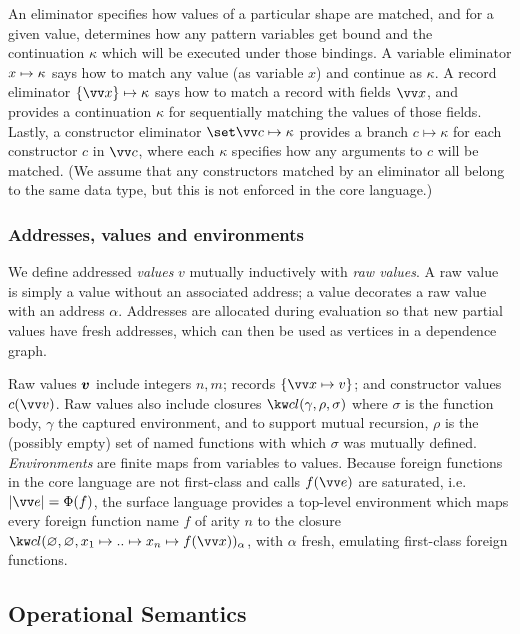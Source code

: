 An eliminator specifies how values of a particular shape are matched, and for a given value, determines how
any pattern variables get bound and the continuation $\kappa$ which will be executed under those bindings. A
variable eliminator ${x}\mapsto{\kappa}$ says how to match any value (as variable $x$) and continue as
$\kappa$. A record eliminator $\elimRecord{\seq{x}}{\kappa}$ says how to match a record with fields $\seq{x}$,
and provides a continuation $\kappa$ for sequentially matching the values of those fields. Lastly, a
constructor eliminator $\elimConstr{\seq{c \mapsto \kappa}}$ provides a branch $c \mapsto \kappa$ for each
constructor $c$ in $\seq{c}$, where each $\kappa$ specifies how any arguments to $c$ will be matched. (We
assume that any constructors matched by an eliminator all belong to the same data type, but this is not
enforced in the core language.)

\subsubsection{Addresses, values and environments}
\label{sec:core:values}

We define addressed \emph{values} $v$ mutually inductively with \emph{raw values}. A raw value is simply a
value without an associated address; a value decorates a raw value with an address $\alpha$. Addresses are
allocated during evaluation so that new partial values have fresh addresses, which can then be used as
vertices in a dependence graph.

Raw values $\bm{v}$ include integers $n, m$; records  $\exRecord{\seq{x \mapsto v}}$; and constructor values
$\exConstr{c}{\seq{v}}$. Raw values also include closures $\exClosure{\gamma}{\rho}{\sigma}$ where $\sigma$ is
the function body, $\gamma$ the captured environment, and to support mutual recursion, ${\rho}$ is the
(possibly empty) set of named functions with which $\sigma$ was mutually defined. \emph{Environments} are
finite maps from variables to values. Because foreign functions in the core language are not first-class and
calls $\exForeignApp{f}{\seq{e}}$ are saturated, i.e.~$\length{\seq{e}} = \Phi{(f)}$, the surface language
provides a top-level environment which maps every foreign function name ${f}$ of arity $n$ to the closure
$\annClosure{\envEmpty}{\envEmpty}{\elimVar{x_1}{\elimVar{\iter}{\elimVar{x_{n}}{\exForeignApp{f}{\seq{x}}}}}}{\alpha}$,
with $\alpha$ fresh, emulating first-class foreign functions.

\subsection{Operational Semantics}
\label{sec:core:semantics}

